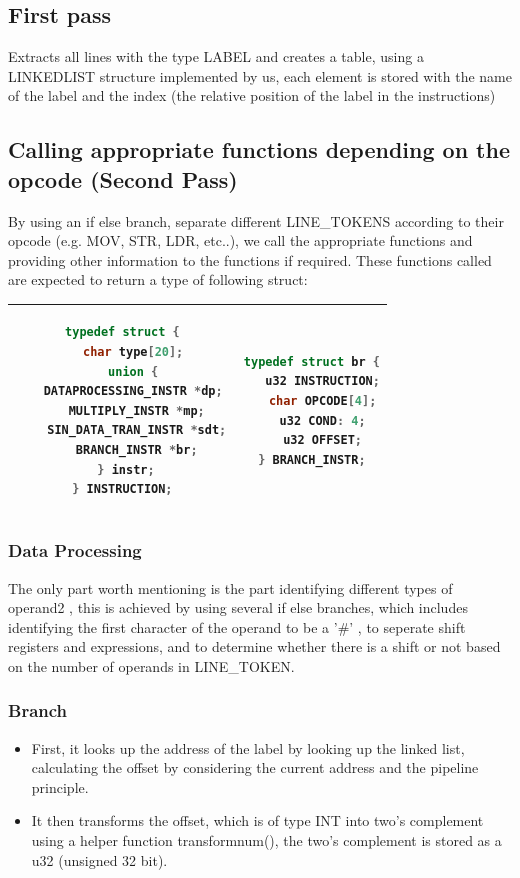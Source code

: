 \documentclass[11pt]{article}
\begin{document}
\subsection{First pass}
Extracts all lines with the type LABEL and creates a table, using a LINKEDLIST structure implemented by us, each element is stored with the name of the label and the index (the relative position of the label in the instructions)
\subsection{Calling appropriate functions depending on the opcode (Second Pass)}
By using an if else branch, separate different LINE{\_}TOKENS according to their opcode (e.g. MOV, STR, LDR, etc..), we call the appropriate functions and providing other information to the functions if required. These functions called are expected to return a type of following struct: 

\begin{center}
\begin{tabular}{|c|c|}
\hline
\begin{lstlisting}[language = C]
typedef struct {
   char type[20];
   union {
	DATAPROCESSING_INSTR *dp; 
	MULTIPLY_INSTR *mp;
	SIN_DATA_TRAN_INSTR *sdt;
	BRANCH_INSTR *br;
   } instr;  
} INSTRUCTION;
\end{lstlisting} &

\begin{lstlisting}[language = C]
typedef struct br {
   u32 INSTRUCTION;
   char OPCODE[4];
   u32 COND: 4;
   u32 OFFSET;
} BRANCH_INSTR;
\end{lstlisting}\\
\hline

\end{tabular}
\end{center}

\subsubsection{Data Processing}
The only part worth mentioning is the part identifying different types of operand2 , this is achieved by using several if else branches, which includes identifying the first character of the operand to be a '\#' , to seperate shift registers and expressions, and to determine whether there is a shift or not based on the number of operands in LINE{\_}TOKEN. 

\subsubsection{Branch}
\begin{itemize}  
\item First, it looks up the address of the label by looking up the linked list, calculating the offset by considering the current address and the pipeline principle.

\item It then transforms the offset, which is of type INT into two's complement using a helper function transformnum(), the two's complement is stored as a u32 (unsigned 32 bit).
\end{itemize}
\end{document}
